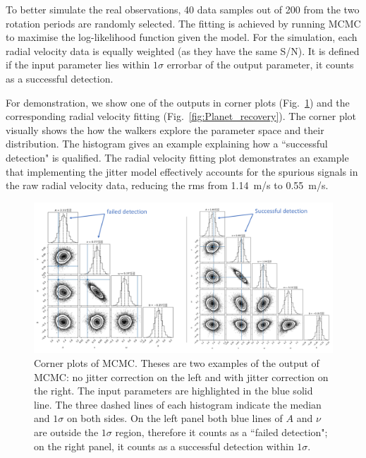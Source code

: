 To better simulate the real observations, 40 data samples out of 200 from the two rotation periods are randomly selected.  
The fitting is achieved by running MCMC to maximise the log-likelihood function
given the model. For the simulation, each radial velocity data is equally weighted (as they have the same S/N). 
It is defined if the input parameter lies within $1\sigma$ errorbar of the output parameter, it counts as a 
successful detection. 

For demonstration, we show one of the outputs in corner plots (Fig.~\ref{fig:Corner}) and the corresponding 
radial velocity fitting (Fig.~\ref{fig:Planet_recovery}). The corner plot visually shows the how the walkers explore the parameter 
space and their distribution. The histogram gives an example explaining how a ``successful detection" is qualified. 
The radial velocity fitting plot demonstrates an example that implementing the jitter model effectively 
accounts for the spurious signals in the raw radial velocity data, reducing the rms from 1.14~m/s to 0.55~m/s. 

\begin{figure}[tbp]
\centering
\includegraphics[width = 0.99 \linewidth]
{./Figures/Methods/Corner.png}
\caption[Corner plots of MCMC]
{Corner plots of MCMC. Theses are two examples of the output of MCMC: no jitter correction on the left and 
with jitter correction on the right. The input parameters are highlighted in the 
blue solid line. The three dashed lines of each histogram indicate the median and $1\sigma$ on both sides. On the 
left panel both blue lines of $A$ and $\nu$ are outside the $1\sigma$ region, therefore it counts as a ``failed detection";
on the right panel, it counts as a successful detection within $1\sigma$.}
\label{fig:Corner}
\end{figure} 

